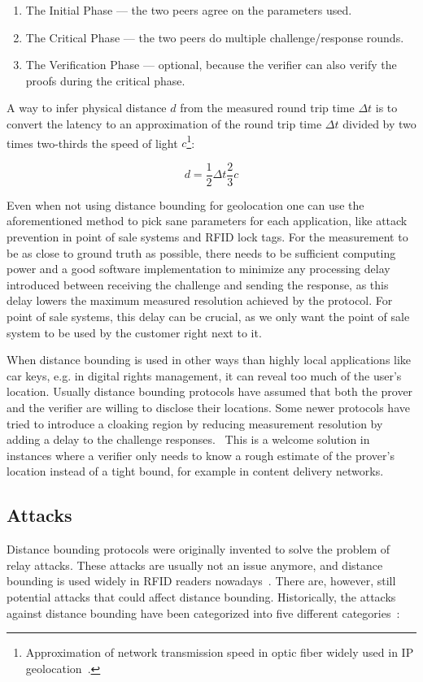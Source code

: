 \begin{enumerate}
  \item The Initial Phase --- the two peers agree on the parameters used.
  \item The Critical Phase --- the two peers do multiple challenge/response rounds.
  \item The Verification Phase --- optional, because the verifier can also verify the proofs during the critical phase.
\end{enumerate}

A way to infer physical distance \(d\) from the measured round trip time \(\Delta t\) is to convert the latency to an approximation of the round trip time \(\Delta t\) divided by two times two-thirds the speed of light \(c\)\footnote{Approximation of network transmission speed in optic fiber widely used in IP geolocation~\cite{Candela2020-am}.}:

\begin{equation*}
  d = \frac{1}{2}\Delta t \frac{2}{3}c
\end{equation*}

Even when not using distance bounding for geolocation one can use the aforementioned method to pick sane parameters for each application, like attack prevention in point of sale systems and RFID lock tags. For the measurement to be as close to ground truth as possible, there needs to be sufficient computing power and a good software implementation to minimize any processing delay introduced between receiving the challenge and sending the response, as this delay lowers the maximum measured resolution achieved by the protocol. For point of sale systems, this delay can be crucial, as we only want the point of sale system to be used by the customer right next to it.

When distance bounding is used in other ways than highly local applications like car keys, e.g. in digital rights management, it can reveal too much of the user's location. Usually distance bounding protocols have assumed that both the prover and the verifier are willing to disclose their locations. Some newer protocols have tried to introduce a cloaking region by reducing measurement resolution by adding a delay to the challenge responses.~\cite{Molina-Martinez2018-nw} This is a welcome solution in instances where a verifier only needs to know a rough estimate of the prover's location instead of a tight bound, for example in content delivery networks.

\subsection{Attacks}
Distance bounding protocols were originally invented to solve the problem of relay attacks. These attacks are usually not an issue anymore, and distance bounding is used widely in RFID readers nowadays~\cite{Nikov_undated-vv}. There are, however, still potential attacks that could affect distance bounding. Historically, the attacks against distance bounding have been categorized into five different categories~\cite{Boureanu_undated-bn}:

